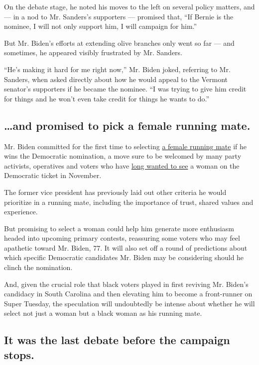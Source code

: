 On the debate stage, he noted his moves to the left on several policy
matters, and --- in a nod to Mr. Sanders's supporters --- promised that,
``If Bernie is the nominee, I will not only support him, I will campaign
for him.''

But Mr. Biden's efforts at extending olive branches only went so far ---
and sometimes, he appeared visibly frustrated by Mr. Sanders.

``He's making it hard for me right now,'' Mr. Biden joked, referring to
Mr. Sanders, when asked directly about how he would appeal to the
Vermont senator's supporters if he became the nominee. ``I was trying to
give him credit for things and he won't even take credit for things he
wants to do.''

\hypertarget{and-promised-to-pick-a-female-running-mate}{%
\subsection{\ldots{}and promised to pick a female running
mate.}\label{and-promised-to-pick-a-female-running-mate}}

Mr. Biden committed for the first time to selecting
\href{https://www.nytimes.com/2020/03/15/us/politics/joe-biden-female-vice-president.html}{a
female running mate} if he wins the Democratic nomination, a move sure
to be welcomed by many party activists, operatives and voters who have
\href{https://www.nytimes.com/2020/03/09/us/politics/democrats-women-vice-president.html}{long
wanted to see} a woman on the Democratic ticket in November.

The former vice president has previously laid out other criteria he
would prioritize in a running mate, including the importance of trust,
shared values and experience.

But promising to select a woman could help him generate more enthusiasm
headed into upcoming primary contests, reassuring some voters who may
feel apathetic toward Mr. Biden, 77. It will also set off a round of
predictions about which specific Democratic candidates Mr. Biden may be
considering should he clinch the nomination.

And, given the crucial role that black voters played in first reviving
Mr. Biden's candidacy in South Carolina and then elevating him to become
a front-runner on Super Tuesday, the speculation will undoubtedly be
intense about whether he will select not just a woman but a black woman
as his running mate.

\hypertarget{it-was-the-last-debate-before-the-campaign-stops}{%
\subsection{It was the last debate before the campaign
stops.}\label{it-was-the-last-debate-before-the-campaign-stops}}

